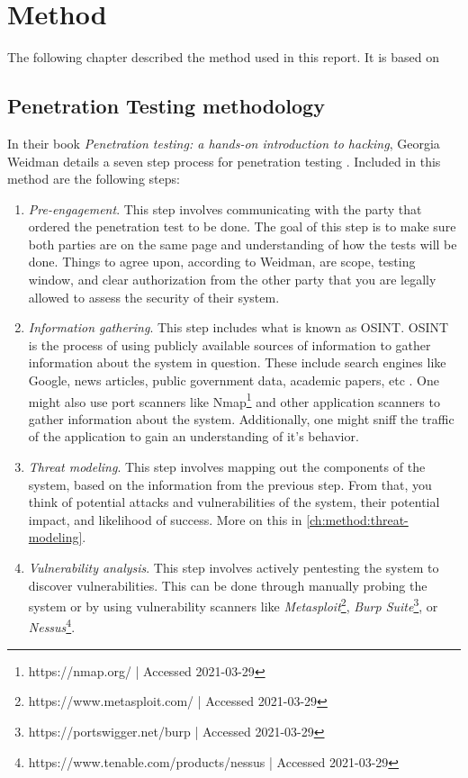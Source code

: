\chapter{Method} \label{ch:method}
The following chapter described the method used in this report. It is based on 

\section{Penetration Testing methodology}
In their book \textit{Penetration testing: a hands-on introduction to hacking}, Georgia Weidman details a seven step process for penetration testing \cite{weidman2014}. Included in this method are the following steps:
\begin{enumerate}
    \item \textit{Pre-engagement}. This step involves communicating with the party that ordered the penetration test to be done. The goal of this step is to make sure both parties are on the same page and understanding of how the tests will be done. Things to agree upon, according to Weidman, are scope, testing window, and clear authorization from the other party that you are legally allowed to assess the security of their system.
    \item \textit{Information gathering}. This step includes what is known as \gls{OSINT}. \gls{OSINT} is the process of using publicly available sources of information to gather information about the system in question. These include search engines like Google, news articles, public government data, academic papers, etc \cite{steele2007open}. One might also use port scanners like Nmap\footnote{https://nmap.org/ | Accessed 2021-03-29} and other application scanners to gather information about the system. Additionally, one might sniff the traffic of the application to gain an understanding of it's behavior.
    \item \textit{Threat modeling}. This step involves mapping out the components of the system, based on the information from the previous step. From that, you think of potential attacks and vulnerabilities of the system, their potential impact, and likelihood of success. More on this in \ref{ch:method:threat-modeling}.
    \item \textit{Vulnerability analysis}. This step involves actively pentesting the system to discover vulnerabilities. This can be done through manually probing the system or by using vulnerability scanners like \textit{Metasploit}\footnote{https://www.metasploit.com/ | Accessed 2021-03-29}, \textit{Burp Suite}\footnote{https://portswigger.net/burp | Accessed 2021-03-29}, or \textit{Nessus}\footnote{https://www.tenable.com/products/nessus | Accessed 2021-03-29}.

\end{enumerate}
